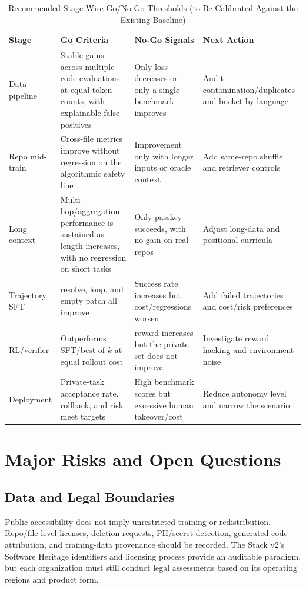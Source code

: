 \documentclass[10pt,a4paper,UTF8,fontset=none]{ctexart}
\begin{document}
\begin{table}[htbp]
\centering
\caption{Recommended Stage-Wise Go/No-Go Thresholds (to Be Calibrated Against the Existing Baseline)}
\label{en:tab:gates}
\small
\begin{tabularx}{\textwidth}{p{2.5cm}YYp{3.2cm}}
\toprule
Stage & Go Criteria & No-Go Signals & Next Action \\
\midrule
Data pipeline & Stable gains across multiple code evaluations at equal token counts, with explainable false positives & Only loss decreases or only a single benchmark improves & Audit contamination/duplicates and bucket by language \\
Repo mid-train & Cross-file metrics improve without regression on the algorithmic safety line & Improvement only with longer inputs or oracle context & Add same-repo shuffle and retriever controls \\
Long context & Multi-hop/aggregation performance is sustained as length increases, with no regression on short tasks & Only passkey succeeds, with no gain on real repos & Adjust long-data and positional curricula \\
Trajectory SFT & resolve, loop, and empty patch all improve & Success rate increases but cost/regressions worsen & Add failed trajectories and cost/risk preferences \\
RL/verifier & Outperforms SFT/best-of-$k$ at equal rollout cost & reward increases but the private set does not improve & Investigate reward hacking and environment noise \\
Deployment & Private-task acceptance rate, rollback, and risk meet targets & High benchmark scores but excessive human takeover/cost & Reduce autonomy level and narrow the scenario \\
\bottomrule
\end{tabularx}
\end{table}

\section{Major Risks and Open Questions}

\subsection{Data and Legal Boundaries}

Public accessibility does not imply unrestricted training or redistribution. Repo/file-level licenses, deletion requests, PII/secret detection, generated-code attribution, and training-data provenance should be recorded. The Stack v2's Software Heritage identifiers and licensing process provide an auditable paradigm\cite{en:lozhkov2024starcoder2}, but each organization must still conduct legal assessments based on its operating regions and product form.
\end{document}
